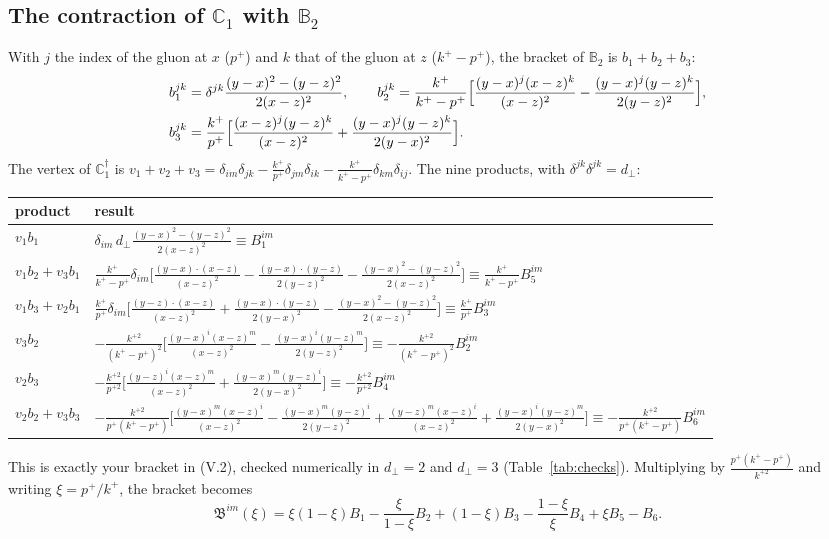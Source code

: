 \documentclass[10pt]{article}
\numberwithin{equation}{section}
\def\mf#1{\mathbb{#1}}
\begin{document}
\subsection{The contraction of \texorpdfstring{$\mf C_1$}{C1} with \texorpdfstring{$\mf B_2$}{B2}}
With $j$ the index of the gluon at $x$ ($p^+$) and $k$ that of the gluon at $z$ ($k^+-p^+$), the bracket of $\mf B_2$ is $b_1+b_2+b_3$:
\begin{align}
b_1^{jk}&=\delta^{jk}\frac{(y-x)^2-(y-z)^2}{2(x-z)^2},\qquad
b_2^{jk}=\frac{k^+}{k^+-p^+}\Big[\frac{(y-x)^j(x-z)^k}{(x-z)^2}-\frac{(y-x)^j(y-z)^k}{2(y-z)^2}\Big],\notag\\
b_3^{jk}&=\frac{k^+}{p^+}\Big[\frac{(x-z)^j(y-z)^k}{(x-z)^2}+\frac{(y-x)^j(y-z)^k}{2(y-x)^2}\Big].
\end{align}
The vertex of $\mf C_1^\dagger$ is $v_1+v_2+v_3=\delta_{im}\delta_{jk}-\frac{k^+}{p^+}\delta_{jm}\delta_{ik}-\frac{k^+}{k^+-p^+}\delta_{km}\delta_{ij}$. The nine products, with $\delta^{jk}\delta^{jk}=d_\perp$:
\begin{center}\small
\begin{tabular}{@{}l l@{}}
product & result\\ \hline
$v_1b_1$ & $\delta_{im}\,d_\perp\frac{(y-x)^2-(y-z)^2}{2(x-z)^2}\equiv B_1^{im}$\\
$v_1b_2+v_3b_1$ & $\frac{k^+}{k^+-p^+}\delta_{im}\Big[\frac{(y-x)\cdot(x-z)}{(x-z)^2}-\frac{(y-x)\cdot(y-z)}{2(y-z)^2}-\frac{(y-x)^2-(y-z)^2}{2(x-z)^2}\Big]\equiv\frac{k^+}{k^+-p^+}B_5^{im}$\\
$v_1b_3+v_2b_1$ & $\frac{k^+}{p^+}\delta_{im}\Big[\frac{(y-z)\cdot(x-z)}{(x-z)^2}+\frac{(y-x)\cdot(y-z)}{2(y-x)^2}-\frac{(y-x)^2-(y-z)^2}{2(x-z)^2}\Big]\equiv\frac{k^+}{p^+}B_3^{im}$\\
$v_3b_2$ & $-\frac{k^{+2}}{(k^+-p^+)^2}\Big[\frac{(y-x)^i(x-z)^m}{(x-z)^2}-\frac{(y-x)^i(y-z)^m}{2(y-z)^2}\Big]\equiv-\frac{k^{+2}}{(k^+-p^+)^2}B_2^{im}$\\
$v_2b_3$ & $-\frac{k^{+2}}{p^{+2}}\Big[\frac{(y-z)^i(x-z)^m}{(x-z)^2}+\frac{(y-x)^m(y-z)^i}{2(y-x)^2}\Big]\equiv-\frac{k^{+2}}{p^{+2}}B_4^{im}$\\
$v_2b_2+v_3b_3$ & $-\frac{k^{+2}}{p^+(k^+-p^+)}\Big[\frac{(y-x)^m(x-z)^i}{(x-z)^2}-\frac{(y-x)^m(y-z)^i}{2(y-z)^2}+\frac{(y-z)^m(x-z)^i}{(x-z)^2}+\frac{(y-x)^i(y-z)^m}{2(y-x)^2}\Big]\equiv-\frac{k^{+2}}{p^+(k^+-p^+)}B_6^{im}$\\
\end{tabular}
\end{center}
This is exactly your bracket in (V.2), checked numerically in $d_\perp=2$ and $d_\perp=3$ (Table~\ref{tab:checks}). Multiplying by $\frac{p^+(k^+-p^+)}{k^{+2}}$ and writing $\xi=p^+/k^+$, the bracket becomes
\begin{equation}
\mathfrak B^{im}(\xi)=\xi(1-\xi)B_1-\frac{\xi}{1-\xi}B_2+(1-\xi)B_3-\frac{1-\xi}{\xi}B_4+\xi B_5-B_6 .
\label{eq:frakB}
\end{equation}
\end{document}
